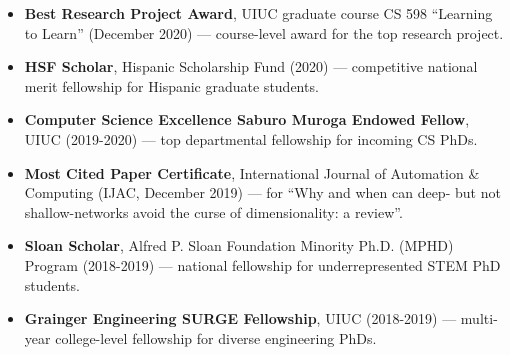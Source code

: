 \documentclass{article}
\newenvironment{changemargin}[2]{%
  \begin{list}{}{%
    \setlength{\topsep}{0pt}%
    \setlength{\leftmargin}{#1}%
    \setlength{\rightmargin}{#2}%
    \setlength{\listparindent}{\parindent}%
    \setlength{\itemindent}{\parindent}%
    \setlength{\parsep}{\parskip}%
  }%
  \item[]}{\end{list}
}
\newenvironment{body} {
		\vspace*{-16pt}
		\begin{changemargin}{-0.25in}{-0.5in}
	  }
		{\end{changemargin}\vspace{8pt plus 12pt}
	}
\begin{document}
\begin{body}
\begin{itemize}
    \item \textbf{Best Research Project Award}, UIUC graduate course CS 598 ``Learning to Learn'' (December 2020) --- course-level award for the top research project.
    \item \textbf{HSF Scholar}, Hispanic Scholarship Fund (2020) --- competitive national merit fellowship for Hispanic graduate students.
    \item \textbf{Computer Science Excellence Saburo Muroga Endowed Fellow}, UIUC (2019-2020) --- top departmental fellowship for incoming CS PhDs.
    \item \textbf{Most Cited Paper Certificate}, International Journal of Automation \& Computing (IJAC, December 2019) --- for ``Why and when can deep- but not shallow-networks avoid the curse of dimensionality: a review''.
	\item \textbf{Sloan Scholar}, Alfred P. Sloan Foundation Minority Ph.D. (MPHD) Program (2018-2019) --- national fellowship for underrepresented STEM PhD students.
	\item \textbf{Grainger Engineering SURGE Fellowship}, UIUC (2018-2019) --- multi-year college-level fellowship for diverse engineering PhDs.
\end{itemize}
\end{body}
\end{document}
